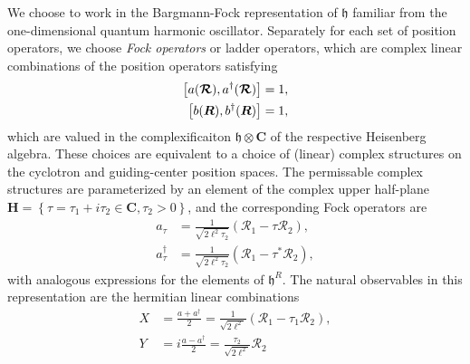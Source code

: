 \documentclass[aps,prb,twocolumn,letterpaper,twoside,nobalancelastpage,groupedaddress,amsmath,amssymb,floatfix,citeautoscript]{revtex4-1}
\begin{document}
We choose to work in the Bargmann-Fock representation of $\mathfrak{h}$ familiar from the one-dimensional quantum harmonic oscillator. Separately for each set of position operators, we choose \textit{Fock operators} or ladder operators, which are complex linear combinations of the position operators satisfying
\begin{align*}
\comm{a(\boldsymbol{\mathcal{R}})}{a^{\dag}(\boldsymbol{\mathcal{R}})} &= 1, \\
\comm{b(\boldsymbol{R})}{b^{\dag}(\boldsymbol{R})} &= 1,
\end{align*}
which are valued in the complexificaiton $\mathfrak{h}\otimes \mathbf{C}$ of the respective Heisenberg algebra. These choices are equivalent to a choice of (linear) complex structures on the cyclotron and guiding-center position spaces. The permissable complex structures are parameterized by an element of the complex upper half-plane $\mathbf{H} = \left\{\tau = \tau_1 + i\tau_2 \in \mathbf{C}, \tau_2 >0\right\}$, and the corresponding Fock operators are
\begin{align}
\label{eq-fock-tau}
a_{\tau} &= \frac{1}{\sqrt{2\ell^2\tau_2}}\left(\mathcal{R}_1 - \tau\mathcal{R}_2\right),\\ \nonumber
a_{\tau}^{\dag} &= \frac{1}{\sqrt{2\ell^2\tau_2}}\left(\mathcal{R}_1 - \tau^{\ast}\mathcal{R}_2\right),
\end{align}
with analogous expressions for the elements of $\mathfrak{h}^{R}$.
The natural observables in this representation are the hermitian linear combinations
\begin{align*}
X &= \frac{a + a^{\dag}}{2} = \frac{1}{\sqrt{2\ell^2}}\left(\mathcal{R}_1 - \tau_1\mathcal{R}_2\right),\\
Y &= i\frac{a- a^{\dag}}{2} = \frac{\tau_2}{\sqrt{2\ell^2}}\mathcal{R}_2
\end{align*}

\end{document}
